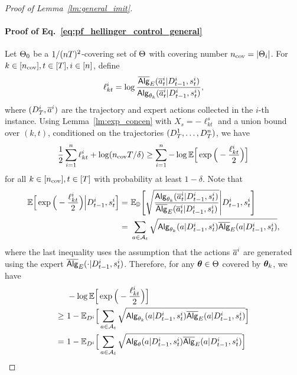 \begin{proof}[Proof of Lemma~\ref{lm:general_imit}]
\paragraph{Proof of Eq.~\eqref{eq:pf_hellinger_control_general}}
Let ${\Theta}_{0}$ be a $1/({n}{T})^2$-covering set of ${\Theta}$ with covering number ${n_{\mathrm{cov}}}=|{\Theta}_{i}|$. 
For $k\in[{n_{\mathrm{cov}}}],t\in[T],i\in[{n}]$, define  $$
\ell^i_{kt}
=\log 
\frac{\overline{\mathsf{Alg}}_{{E}}({\overline{a}}^{i}_t|{D}_{t-1}^{i},{s}^{i}_t)}{{\mathsf{Alg}}_{{\theta}_k}({\overline{a}}^{i}_t|{D}_{t-1}^{i},{s}^{i}_t)}
,$$
where $({D}_{T}^{i},{\overline{a}}^{i})$ are the trajectory and expert actions collected in the $i$-th instance. Using Lemma~\ref{lm:exp_concen} with $X_s=-\ell^s_{kt}$ and a union bound over $(k,t)$, conditioned on the trajectories $({D}^1_{T},\ldots,{D}^{n}_{T})$, we have
\begin{align*}
    \frac{1}{2}\sum_{i=1}^{n} \ell_{kt}^i+\log({n_{\mathrm{cov}}} {T}/\delta)\geq
    \sum_{i=1}^n-\log\mathbb{E}\Big[\exp\Big(-\frac{\ell_{kt}^{i}}{2}\Big)\Big]
\end{align*}
for all $k\in[{n_{\mathrm{cov}}}],t\in[{T}]$
with probability at least $1-\delta$. Note that
\begin{align*}
   \mathbb{E}\Big[\exp\Big(-\frac{\ell_{kt}^{i}}{2}\Big)\Big|{D}_{t-1}^{i},{s}_t^{i}\Big]
   =&~
\mathbb{E}_{{\mathbb{D}}}\Bigg[\sqrt{\frac{{\mathsf{Alg}}_{{\theta}_k}({\overline{a}}^{i}_t|{D}_{t-1}^{i},{s}^{i}_t)}{\overline{\mathsf{Alg}}_{{E}}({\overline{a}}^{i}_t|{D}_{t-1}^{i},{s}^{i}_t)}}\Bigg|{D}_{t-1}^{i},{s}_t^{i}\Bigg]\\
=&~
\sum_{{a}\in{\mathcal{A}}_t}\sqrt{{\mathsf{Alg}}_{{\theta}_k}({a}|{D}_{t-1}^{i},{s}^{i}_t) \overline{\mathsf{Alg}}_{{E}}({a}|{D}_{t-1}^{i},{s}^{i}_t)},
\end{align*}
where the last inequality uses the assumption that the actions ${\overline{a}}^{i}$ are generated using the expert $\overline{\mathsf{Alg}}_{{E}}(\cdot|{D}_{t-1}^{i},{s}^{i}_t)$. Therefore, for any ${\boldsymbol \theta}\in\Theta$ covered by ${\boldsymbol \theta}_k$, we have
\begin{align*}
&~
    -\log\E\Big[\exp\Big(-\frac{\ell_{kt}^{i}}{2}\Big)\Big]\\
    \geq&~ 1-
 \E_{\dset^\ith}\Big[\sum_{\action\in\actionsp_t}\sqrt{\sAlg_{\Par_k}(\action|\dset_{t-1}^\ith,\state^\ith_t) \osAlg_{\shortexp}(\action|\dset_{t-1}^\ith,\state^\ith_t)}\Big]
    \\
    =&~
    1-
\E_{\dset^\ith}\Big[\sum_{\action\in\actionsp_t}\sqrt{\sAlg_{\Par}(\action|\dset_{t-1}^\ith,\state^\ith_t) \osAlg_{\shortexp}(\action|\dset_{t-1}^\ith,\state^\ith_t)}\Big]\\

\end{align*}
\end{proof}
